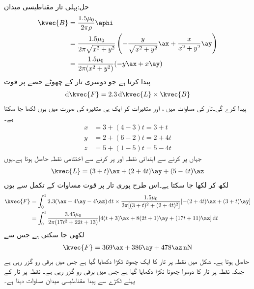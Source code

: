 حل:پہلی تار مقناطیسی میدان 
\begin{align*}
\kvec{B}&=\frac{1.5 \mu_0}{2\pi \rho}\aphi\\
&=\frac{1.5\mu_0}{2\pi \sqrt{x^2+y^2}}\left(-\frac{y}{\sqrt{x^2+y^2}}\ax+\frac{x}{x^2+y^2}\ay\right)\\
&=\frac{1.5\mu_0}{2\pi(x^2+y^2)}(-y\ax+x\ay)
\end{align*}
پیدا کرتا ہے جو دوسری تار کے چھوٹے حصے  پر قوت
\begin{align}\label{مثال_امالہ_ترچھی_تار}
\dif \kvec{F}=2.3 \dif \kvec{L} \times \kvec{B}
\end{align} 
پیدا کرے گی۔تار کی مساوات  میں ،  اور  متغیرات کو ایک ہی متغیرہ  کی صورت میں یوں لکھا جا سکتا ہے۔
\begin{align*}
x&=3+(4-3)t=3+t\\
y&=2+(6-2)t=2+4t\\
z&=5+(1-5)t=5-4t
\end{align*}
جہاں  پر کرنے سے ابتدائی نقطہ  اور  پر کرنے سے اختتامی نقطہ  حاصل ہوتا ہے۔یوں
\begin{align*}
\kvec{L}=(3+t)\ax+(2+4t)\ay+(5-4t)\az
\end{align*}
لکھ کر  لکھا جا سکتا ہے۔اس طرح پوری تار پر قوت مساوات  کے تکمل سے یوں 
\begin{align*}
\kvec{F}&=\int_0^1 2.3 ( \ax+4\ay-4 \az)\dif t \times \frac{1.5\mu_0}{2\pi[(3+t)^2+(2+4t)^2]}[-(2+4t)\ax+(3+t)\ay]\\
&=\int_0^1 \frac{3.45\mu_0}{2\pi(17t^2+22t+13)}[4(t+3)\ax+8(2t+1)\ay+(17t+11)\az]\dif t
\end{align*}
لکھی جا سکتی ہے جس سے
\begin{align*}
\kvec{F}=369\ax+386\ay+478\az \, \si{\nano\newton}
\end{align*}
حاصل ہوتا ہے۔
شکل میں نقطہ  پر تار کا ایک چھوٹا ٹکڑا  دکھایا گیا ہے جس میں  برقی رو گزر رہی ہے  جبکہ نقطہ  پر تار کا دوسرا چھوٹا ٹکڑا  دکھایا گیا ہے جس میں  برقی رو گزر رہی ہے۔ نقطہ  پر تار کے پہلے ٹکڑے سے پیدا مقناطیسی میدان مساوات  دیتا ہے۔

